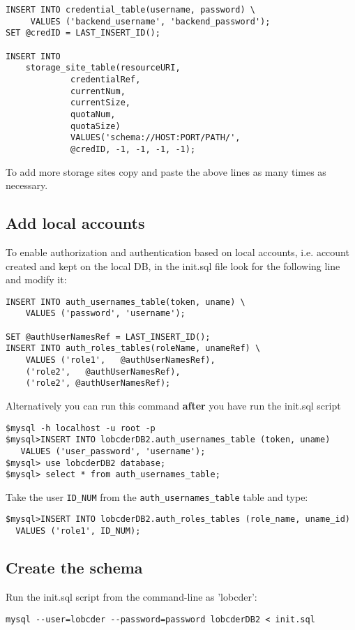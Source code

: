 \documentclass[a4paper,10pt]{article}
\begin{document}
\begin{lstlisting}
INSERT INTO credential_table(username, password) \
	 VALUES ('backend_username', 'backend_password');
SET @credID = LAST_INSERT_ID();

INSERT INTO 
	storage_site_table(resourceURI, 
			 credentialRef, 
			 currentNum, 
			 currentSize, 
			 quotaNum, 
			 quotaSize)
			 VALUES('schema://HOST:PORT/PATH/', 
			 @credID, -1, -1, -1, -1);
\end{lstlisting}

To add more storage sites copy and paste the above lines as many times as necessary. 

\subsection{Add local accounts}

To enable authorization and authentication based on local accounts, i.e. account created and kept on the local 
DB, in the init.sql file look for the following line and modify it:

 \begin{lstlisting}
INSERT INTO auth_usernames_table(token, uname) \
	VALUES ('password', 'username');

SET @authUserNamesRef = LAST_INSERT_ID();
INSERT INTO auth_roles_tables(roleName, unameRef) \
	VALUES ('role1',   @authUserNamesRef),
	('role2',   @authUserNamesRef),
	('role2', @authUserNamesRef);
\end{lstlisting}

Alternatively you can run this command \textbf{after} you have run the init.sql script 
\begin{lstlisting}
$mysql -h localhost -u root -p
$mysql>INSERT INTO lobcderDB2.auth_usernames_table (token, uname) 
   VALUES ('user_password', 'username');
$mysql> use lobcderDB2 database;
$mysql> select * from auth_usernames_table;
\end{lstlisting}

Take the user \texttt{ID\_NUM} from the \texttt{auth\_usernames\_table} table and type:
\begin{lstlisting}
$mysql>INSERT INTO lobcderDB2.auth_roles_tables (role_name, uname_id)
  VALUES ('role1', ID_NUM);
\end{lstlisting}


\subsection{Create the schema}
Run the init.sql script from the command-line as 'lobcder': 
\begin{lstlisting}
mysql --user=lobcder --password=password lobcderDB2 < init.sql
\end{lstlisting}
\end{document}
